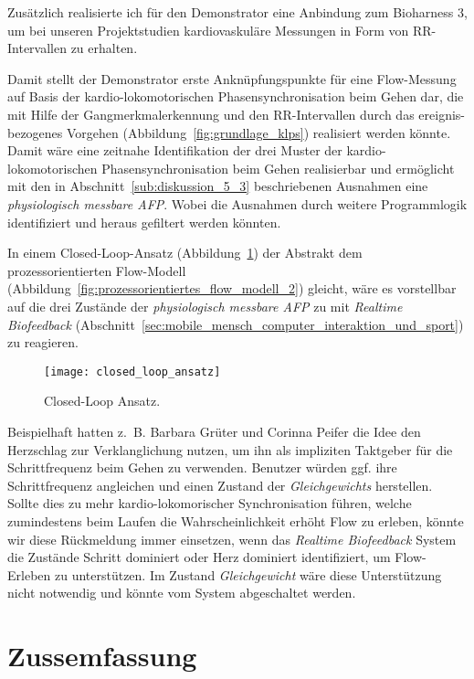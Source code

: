 Zusätzlich realisierte ich für den Demonstrator eine Anbindung zum Bioharness 3, um bei unseren Projektstudien \citep{Grueter2016a} kardiovaskuläre Messungen in Form von RR-Intervallen zu erhalten.

Damit stellt der Demonstrator erste Anknüpfungspunkte für eine Flow-Messung auf Basis der kardio-lokomotorischen Phasensynchronisation beim Gehen dar, die mit Hilfe der Gangmerkmalerkennung und den RR-Intervallen durch das ereignis-bezogenes Vorgehen (Abbildung~\ref{fig:grundlage_klps}) realisiert werden könnte. Damit wäre eine zeitnahe Identifikation der drei Muster der kardio-lokomotorischen Phasensynchronisation beim Gehen realisierbar und ermöglicht mit den in Abschnitt~\ref{sub:diskussion_5_3} beschriebenen Ausnahmen eine \emph{physiologisch messbare \ac{AFP}}. Wobei die Ausnahmen durch weitere Programmlogik identifiziert und heraus gefiltert werden könnten. 

In einem Closed-Loop-Ansatz \citep[][S.~474]{Calvo2015} (Abbildung~\ref{fig:closed_loop_ansatz}) der Abstrakt dem prozessorientierten Flow-Modell (Abbildung~\ref{fig:prozessorientiertes_flow_modell_2}) gleicht, wäre es vorstellbar auf die drei Zustände der \emph{physiologisch messbare \ac{AFP}} zu mit \emph{Realtime Biofeedback} (Abschnitt~\ref{sec:mobile_mensch_computer_interaktion_und_sport}) zu reagieren. 
\begin{figure}
	[!htb] \centering 
	\texttt{[image: closed\_loop\_ansatz]} \caption[Closed-Loop Ansatz.]{Closed-Loop Ansatz.} \label{fig:closed_loop_ansatz} 
\end{figure}

Beispielhaft hatten z.~B. Barbara Grüter und Corinna Peifer die Idee den Herzschlag zur Verklanglichung nutzen, um ihn als impliziten Taktgeber für die Schrittfrequenz beim Gehen zu verwenden. Benutzer würden ggf. ihre Schrittfrequenz angleichen und einen Zustand der \emph{Gleichgewichts} herstellen. Sollte dies zu mehr kardio-lokomorischer Synchronisation führen, welche zumindestens beim Laufen die Wahrscheinlichkeit erhöht Flow zu erleben, könnte wir diese Rückmeldung immer einsetzen, wenn das \emph{Realtime Biofeedback} System die Zustände {Schritt dominiert} oder {Herz dominiert} identifiziert, um Flow-Erleben zu unterstützen. Im Zustand \emph{Gleichgewicht} wäre diese Unterstützung nicht notwendig und könnte vom System abgeschaltet werden. 

\section{Zussemfassung} 

